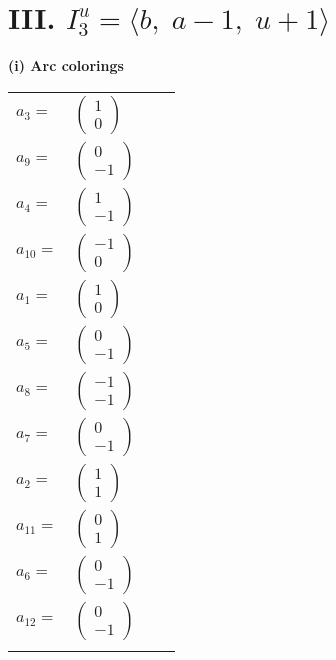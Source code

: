\documentclass[1p]{elsarticle_modified}
\theoremstyle{definition}
\begin{document}
\centering \section*{III. $I^u_{3}= \langle b,\;a-1,\;u+1 \rangle$}
\flushleft \textbf{(i) Arc colorings}\\
\begin{tabular}{m{7pt} m{180pt} m{7pt} m{180pt} }
\flushright $a_{3}=$&$\begin{pmatrix}1\\0\end{pmatrix}$ \\
\flushright $a_{9}=$&$\begin{pmatrix}0\\-1\end{pmatrix}$ \\
\flushright $a_{4}=$&$\begin{pmatrix}1\\-1\end{pmatrix}$ \\
\flushright $a_{10}=$&$\begin{pmatrix}-1\\0\end{pmatrix}$ \\
\flushright $a_{1}=$&$\begin{pmatrix}1\\0\end{pmatrix}$ \\
\flushright $a_{5}=$&$\begin{pmatrix}0\\-1\end{pmatrix}$ \\
\flushright $a_{8}=$&$\begin{pmatrix}-1\\-1\end{pmatrix}$ \\
\flushright $a_{7}=$&$\begin{pmatrix}0\\-1\end{pmatrix}$ \\
\flushright $a_{2}=$&$\begin{pmatrix}1\\1\end{pmatrix}$ \\
\flushright $a_{11}=$&$\begin{pmatrix}0\\1\end{pmatrix}$ \\
\flushright $a_{6}=$&$\begin{pmatrix}0\\-1\end{pmatrix}$ \\
\flushright $a_{12}=$&$\begin{pmatrix}0\\-1\end{pmatrix}$\\&\end{tabular}
\end{document}
